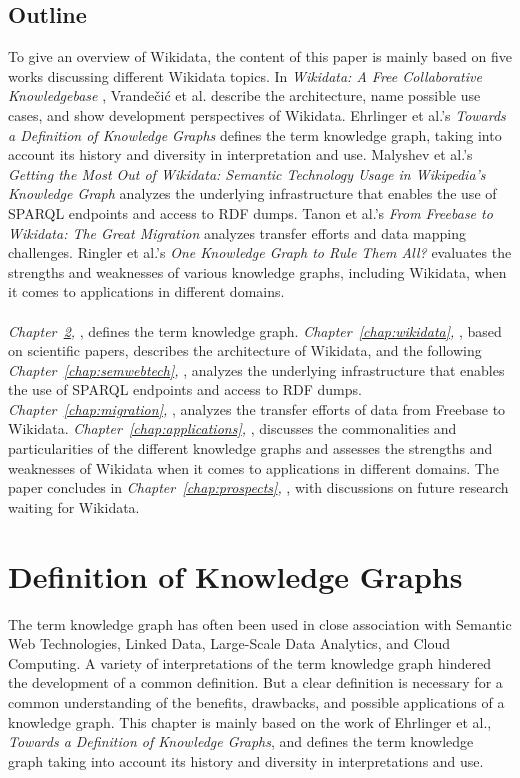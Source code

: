 ﻿\documentclass[11pt,titlepage,oneside,openany]{book}
\begin{document}
\section{Outline}
To give an overview of Wikidata, the content of this paper is mainly based on five works discussing different Wikidata topics. In \textit{Wikidata: A Free Collaborative Knowledgebase} \cite{AFCK01}, Vrandečić et al. describe the architecture, name possible use cases, and show development perspectives of Wikidata. Ehrlinger et al.'s \textit{Towards a Definition of Knowledge Graphs} \cite{TDKG01} defines the term knowledge graph, taking into account its history and diversity in interpretation and use. Malyshev et al.'s \textit{Getting the Most Out of Wikidata: Semantic Technology Usage in Wikipedia's Knowledge Graph} \cite{Malyshev2018GettingTM} analyzes the underlying infrastructure that enables the use of SPARQL endpoints and access to RDF dumps. Tanon et al.'s \textit{From Freebase to Wikidata: The Great Migration} \cite{Tanon2016FromFT} analyzes transfer efforts and data mapping challenges. Ringler et al.'s \textit{One Knowledge Graph to Rule Them All?} \cite{Ringler2017OneKG} evaluates the strengths and weaknesses of various knowledge graphs, including Wikidata, when it comes to applications in different domains.
\\
\\
\textit{Chapter~\ref{chap:kg}, }, defines the term knowledge graph. \textit{Chapter~\ref{chap:wikidata}, }, based on scientific papers, describes the architecture of Wikidata, and the following \textit{Chapter~\ref{chap:semwebtech}, }, analyzes the underlying infrastructure that enables the use of SPARQL endpoints and access to RDF dumps. \textit{Chapter~\ref{chap:migration}, }, analyzes the transfer efforts of data from Freebase to Wikidata. \textit{Chapter~\ref{chap:applications}, }, discusses the commonalities and particularities of the different knowledge graphs and assesses the strengths and weaknesses of Wikidata when it comes to applications in different domains. The paper concludes in \textit{Chapter~\ref{chap:prospects}, }, with discussions on future research waiting for Wikidata.

\chapter{Definition of Knowledge Graphs}
\label{chap:kg}
The term knowledge graph has often been used in close association with Semantic Web Technologies, Linked Data, Large-Scale Data Analytics, and Cloud Computing. A variety of interpretations of the term knowledge graph hindered the development of a common definition. But a clear definition is necessary for a common understanding of the benefits, drawbacks, and possible applications of a knowledge graph. \cite{TDKG01}
This chapter is mainly based on the work of Ehrlinger et al., \textit{Towards a Definition of Knowledge Graphs}, \cite{TDKG01} and defines the term knowledge graph taking into account its history and diversity in interpretations and use.
\\
\\
\end{document}
